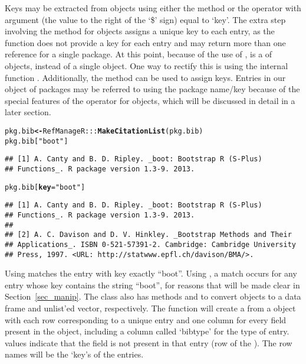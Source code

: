 \documentclass[article]{jss}\usepackage[]{graphicx}\usepackage[]{color}
\makeatletter
\newcommand{\hlstr}[1]{\textcolor[rgb]{0.125,0.125,1}{#1}}%
\newcommand{\hlstd}[1]{\textcolor[rgb]{0.251,0.251,0.282}{#1}}%
\newcommand{\hlkwb}[1]{\textcolor[rgb]{0.439,0.251,1}{\textbf{#1}}}%
\newcommand{\hlkwc}[1]{\textcolor[rgb]{0.529,0,0.184}{\textbf{#1}}}%
\newcommand{\hlkwd}[1]{\textcolor[rgb]{0.251,0.251,0.282}{\textbf{#1}}}%
\newenvironment{kframe}{%
 \def\at@end@of@kframe{}%
 \ifinner\ifhmode%
  \def\at@end@of@kframe{\end{minipage}}%
  \begin{minipage}{\columnwidth}%
 \fi\fi%
 \def\FrameCommand##1{\hskip\@totalleftmargin \hskip-\fboxsep
 \colorbox{shadecolor}{##1}\hskip-\fboxsep
     \hskip-\linewidth \hskip-\@totalleftmargin \hskip\columnwidth}%
 \MakeFramed {\advance\hsize-\width
   \@totalleftmargin\z@ \linewidth\hsize
   \@setminipage}}%
 {\par\unskip\endMakeFramed%
 \at@end@of@kframe}
\newenvironment{knitrout}{}{} %
\newcommand{\bt}{\`{}}
\makeatother
\begin{document}
Keys may be extracted from  objects using either the  method or the \code{\bt$\bt} operator with  argument (the value to the right of the `\$' sign) equal to `key'.  The extra step involving the \code{\bt names<-\bt} method for  objects assigns a unique key to each entry, as the  function does not provide a key for each entry and may return more than one reference for a single package.  At this point, because of the use of ,  is a  of  objects, instead of a single  object.  One way to rectify this is using the internal function .  Additionally, the \code{\bt names<-\bt} method can be used to assign keys.  Entries in our  object of packages may be referred to using the package name/key because of the special features of the \code{\bt[\bt} operator for  objects, which will be discussed in detail in a later section.
\begin{knitrout}
\color{fgcolor}\begin{kframe}
\begin{alltt}
\hlstd{pkg.bib} \hlkwb{<-} \hlstd{RefManageR:::}\hlkwd{MakeCitationList}\hlstd{(pkg.bib)}
\hlstd{pkg.bib[}\hlstr{"boot"}\hlstd{]}
\end{alltt}
\begin{verbatim}
## [1] A. Canty and B. D. Ripley. _boot: Bootstrap R (S-Plus)
## Functions_. R package version 1.3-9. 2013.
\end{verbatim}
\begin{alltt}
\hlstd{pkg.bib[}\hlkwc{key} \hlstd{=} \hlstr{"boot"}\hlstd{]}
\end{alltt}
\begin{verbatim}
## [1] A. Canty and B. D. Ripley. _boot: Bootstrap R (S-Plus)
## Functions_. R package version 1.3-9. 2013.
## 
## [2] A. C. Davison and D. V. Hinkley. _Bootstrap Methods and Their
## Applications_. ISBN 0-521-57391-2. Cambridge: Cambridge University
## Press, 1997. <URL: http://statwww.epfl.ch/davison/BMA/>.
\end{verbatim}
\end{kframe}
\end{knitrout}

Using  matches the entry with key exactly ``boot''.  Using , a match occurs for any entry whose key contains the string ``boot'', for reasons that will be made clear in Section~\ref{sec_manip}.
The  class also has methods  and  to convert  objects to a data frame and unlist'ed vector, respectively.  The function  will create  a  from a  object with each row corresponding to a unique entry and one column for every field present in the  object, including a column called `bibtype' for the type of entry.   values indicate that the field is not present in that entry (row of the ).  The row names will be the `key's of the entries.
\end{document}

